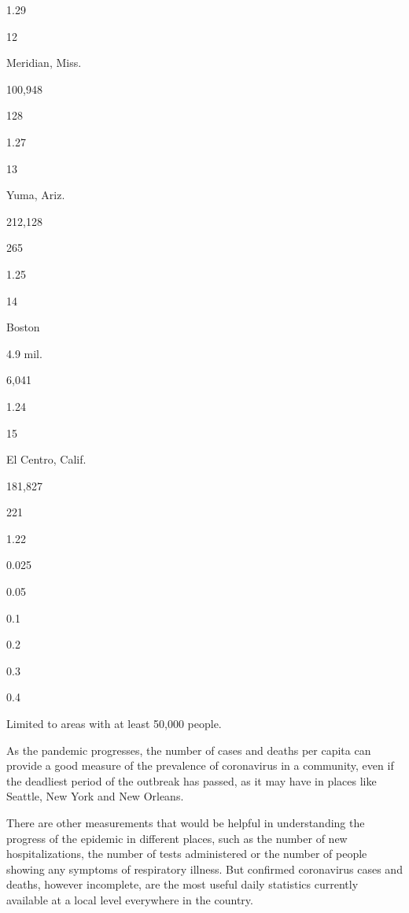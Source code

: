 1.29

12

Meridian, Miss.

100,948

128

1.27

13

Yuma, Ariz.

212,128

265

1.25

14

Boston

4.9 mil.

6,041

1.24

15

El Centro, Calif.

181,827

221

1.22

0.025

0.05

0.1

0.2

0.3

0.4

Limited to areas with at least 50,000 people.

As the pandemic progresses, the number of cases and deaths per capita
can provide a good measure of the prevalence of coronavirus in a
community, even if the deadliest period of the outbreak has passed, as
it may have in places like Seattle, New York and New Orleans.

There are other measurements that would be helpful in understanding the
progress of the epidemic in different places, such as the number of new
hospitalizations, the number of tests administered or the number of
people showing any symptoms of respiratory illness. But confirmed
coronavirus cases and deaths, however incomplete, are the most useful
daily statistics currently available at a local level everywhere in the
country.

